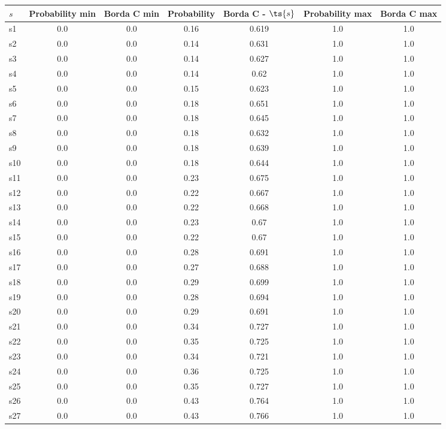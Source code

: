 \documentclass{article}
\begin{document}
\noindent\begin{tabular}{|l|c|c|c|c|c|c|}
\hline
$s$& Probability min & Borda C min & Probability & Borda C - $\ts{s}$ & Probability max & Borda C max\\
\hline
s1 &0.0 & 0.0 & 0.16 & 0.619 & 1.0 & 1.0\\
\hline
s2 &0.0 & 0.0 & 0.14 & 0.631 & 1.0 & 1.0\\
\hline
s3 &0.0 & 0.0 & 0.14 & 0.627 & 1.0 & 1.0\\
\hline
s4 &0.0 & 0.0 & 0.14 & 0.62 & 1.0 & 1.0\\
\hline
s5 &0.0 & 0.0 & 0.15 & 0.623 & 1.0 & 1.0\\
\hline
s6 &0.0 & 0.0 & 0.18 & 0.651 & 1.0 & 1.0\\
\hline
s7 &0.0 & 0.0 & 0.18 & 0.645 & 1.0 & 1.0\\
\hline
s8 &0.0 & 0.0 & 0.18 & 0.632 & 1.0 & 1.0\\
\hline
s9 &0.0 & 0.0 & 0.18 & 0.639 & 1.0 & 1.0\\
\hline
s10 &0.0 & 0.0 & 0.18 & 0.644 & 1.0 & 1.0\\
\hline
s11 &0.0 & 0.0 & 0.23 & 0.675 & 1.0 & 1.0\\
\hline
s12 &0.0 & 0.0 & 0.22 & 0.667 & 1.0 & 1.0\\
\hline
s13 &0.0 & 0.0 & 0.22 & 0.668 & 1.0 & 1.0\\
\hline
s14 &0.0 & 0.0 & 0.23 & 0.67 & 1.0 & 1.0\\
\hline
s15 &0.0 & 0.0 & 0.22 & 0.67 & 1.0 & 1.0\\
\hline
s16 &0.0 & 0.0 & 0.28 & 0.691 & 1.0 & 1.0\\
\hline
s17 &0.0 & 0.0 & 0.27 & 0.688 & 1.0 & 1.0\\
\hline
s18 &0.0 & 0.0 & 0.29 & 0.699 & 1.0 & 1.0\\
\hline
s19 &0.0 & 0.0 & 0.28 & 0.694 & 1.0 & 1.0\\
\hline
s20 &0.0 & 0.0 & 0.29 & 0.691 & 1.0 & 1.0\\
\hline
s21 &0.0 & 0.0 & 0.34 & 0.727 & 1.0 & 1.0\\
\hline
s22 &0.0 & 0.0 & 0.35 & 0.725 & 1.0 & 1.0\\
\hline
s23 &0.0 & 0.0 & 0.34 & 0.721 & 1.0 & 1.0\\
\hline
s24 &0.0 & 0.0 & 0.36 & 0.725 & 1.0 & 1.0\\
\hline
s25 &0.0 & 0.0 & 0.35 & 0.727 & 1.0 & 1.0\\
\hline
s26 &0.0 & 0.0 & 0.43 & 0.764 & 1.0 & 1.0\\
\hline
s27 &0.0 & 0.0 & 0.43 & 0.766 & 1.0 & 1.0\\

\end{tabular}
\end{document}
